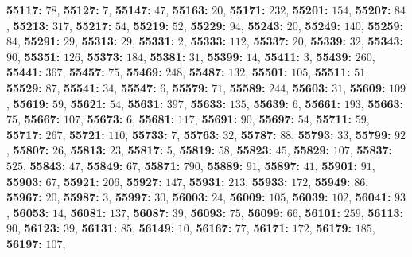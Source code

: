 \textsf{\bfseries 55117:} $78$, \textsf{\bfseries 55127:} $7$, \textsf{\bfseries 55147:} $47$, \textsf{\bfseries 55163:} $20$, \textsf{\bfseries 55171:} $232$, \textsf{\bfseries 55201:} $154$, \textsf{\bfseries 55207:} $84$, \textsf{\bfseries 55213:} $317$, \textsf{\bfseries 55217:} $54$, \textsf{\bfseries 55219:} $52$, \textsf{\bfseries 55229:} $94$, \textsf{\bfseries 55243:} $20$, \textsf{\bfseries 55249:} $140$, \textsf{\bfseries 55259:} $84$, \textsf{\bfseries 55291:} $29$, \textsf{\bfseries 55313:} $29$, \textsf{\bfseries 55331:} $2$, \textsf{\bfseries 55333:} $112$, \textsf{\bfseries 55337:} $20$, \textsf{\bfseries 55339:} $32$, \textsf{\bfseries 55343:} $90$, \textsf{\bfseries 55351:} $126$, \textsf{\bfseries 55373:} $184$, \textsf{\bfseries 55381:} $31$, \textsf{\bfseries 55399:} $14$, \textsf{\bfseries 55411:} $3$, \textsf{\bfseries 55439:} $260$, \textsf{\bfseries 55441:} $367$, \textsf{\bfseries 55457:} $75$, \textsf{\bfseries 55469:} $248$, \textsf{\bfseries 55487:} $132$, \textsf{\bfseries 55501:} $105$, \textsf{\bfseries 55511:} $51$, \textsf{\bfseries 55529:} $87$, \textsf{\bfseries 55541:} $34$, \textsf{\bfseries 55547:} $6$, \textsf{\bfseries 55579:} $71$, \textsf{\bfseries 55589:} $244$, \textsf{\bfseries 55603:} $31$, \textsf{\bfseries 55609:} $109$, \textsf{\bfseries 55619:} $59$, \textsf{\bfseries 55621:} $54$, \textsf{\bfseries 55631:} $397$, \textsf{\bfseries 55633:} $135$, \textsf{\bfseries 55639:} $6$, \textsf{\bfseries 55661:} $193$, \textsf{\bfseries 55663:} $75$, \textsf{\bfseries 55667:} $107$, \textsf{\bfseries 55673:} $6$, \textsf{\bfseries 55681:} $117$, \textsf{\bfseries 55691:} $90$, \textsf{\bfseries 55697:} $54$, \textsf{\bfseries 55711:} $59$, \textsf{\bfseries 55717:} $267$, \textsf{\bfseries 55721:} $110$, \textsf{\bfseries 55733:} $7$, \textsf{\bfseries 55763:} $32$, \textsf{\bfseries 55787:} $88$, \textsf{\bfseries 55793:} $33$, \textsf{\bfseries 55799:} $92$, \textsf{\bfseries 55807:} $26$, \textsf{\bfseries 55813:} $23$, \textsf{\bfseries 55817:} $5$, \textsf{\bfseries 55819:} $58$, \textsf{\bfseries 55823:} $45$, \textsf{\bfseries 55829:} $107$, \textsf{\bfseries 55837:} $525$, \textsf{\bfseries 55843:} $47$, \textsf{\bfseries 55849:} $67$, \textsf{\bfseries 55871:} $790$, \textsf{\bfseries 55889:} $91$, \textsf{\bfseries 55897:} $41$, \textsf{\bfseries 55901:} $91$, \textsf{\bfseries 55903:} $67$, \textsf{\bfseries 55921:} $206$, \textsf{\bfseries 55927:} $147$, \textsf{\bfseries 55931:} $213$, \textsf{\bfseries 55933:} $172$, \textsf{\bfseries 55949:} $86$, \textsf{\bfseries 55967:} $20$, \textsf{\bfseries 55987:} $3$, \textsf{\bfseries 55997:} $30$, \textsf{\bfseries 56003:} $24$, \textsf{\bfseries 56009:} $105$, \textsf{\bfseries 56039:} $102$, \textsf{\bfseries 56041:} $93$, \textsf{\bfseries 56053:} $14$, \textsf{\bfseries 56081:} $137$, \textsf{\bfseries 56087:} $39$, \textsf{\bfseries 56093:} $75$, \textsf{\bfseries 56099:} $66$, \textsf{\bfseries 56101:} $259$, \textsf{\bfseries 56113:} $90$, \textsf{\bfseries 56123:} $39$, \textsf{\bfseries 56131:} $85$, \textsf{\bfseries 56149:} $10$, \textsf{\bfseries 56167:} $77$, \textsf{\bfseries 56171:} $172$, \textsf{\bfseries 56179:} $185$, \textsf{\bfseries 56197:} $107$, 
